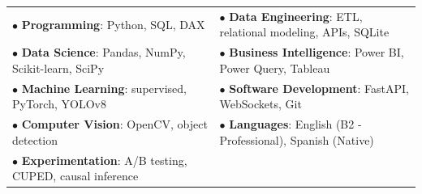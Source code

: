 \documentclass[letterpaper,10pt]{article}
\begin{document}
\noindent
\begin{tabularx}{\linewidth}{@{}X X@{}}
$\bullet$ \textbf{Programming}: Python, SQL, DAX & $\bullet$ \textbf{Data Engineering}: ETL, relational modeling, APIs, SQLite \\
$\bullet$ \textbf{Data Science}: Pandas, NumPy, Scikit-learn, SciPy & $\bullet$ \textbf{Business Intelligence}: Power BI, Power Query, Tableau \\
$\bullet$ \textbf{Machine Learning}: supervised, PyTorch, YOLOv8 & $\bullet$ \textbf{Software Development}: FastAPI, WebSockets, Git \\
$\bullet$ \textbf{Computer Vision}: OpenCV, object detection & $\bullet$ \textbf{Languages}: English (B2 - Professional), Spanish (Native) \\
$\bullet$ \textbf{Experimentation}: A/B testing, CUPED, causal inference & \\
\end{tabularx}
\end{document}
